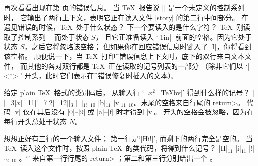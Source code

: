 {%
\ddangerexercise \1再次看看出现在第 \vshippage 页的错误信息。%
当 \TeX\ 报告说 |\vship| 是一个未定义的控制系列时，
它输出了两行上下文，表明它正在读入文件 |story| 的第二行中间部分。%
在遇见错误的时候，\TeX\ 处于什么状态？
下一个要读入的是什么字符？
\answer \TeX\ 刚读取了控制系列 |\vship| 而处于状态 $S$，
且它正准备读入 `|1in|' 前面的空格。因为它处于状态 $S$，之后它将忽略该空格；
但如果你在回应错误信息时键入了 |I\obeyspaces|，你将看到该空格。
顺便说一下，当 \TeX\ 打印^{错误信息上下文}时，底下的双行来自文本文件，
而其他的各对双行都是 \TeX\ 正在读取的记号列表的一部分
（除非它们以 `|<*>|' 开头，此时它们表示在^{错误修复}时插入的文本）。

\ddangerexercise 给定 plain \TeX\ 格式的类别码后，
从输入行 `| $x^2$~  \TeX  ^^62^^6|' 得到什么样的记号？
\answer |$|$_{3}$ |x|$_{11}$ |^|$_7$ |2|$_{12}$ |$|$_{3}$ |~|$_{13}$ \]$_{10}$
 |b|$_{11}$ |v|$_{11}$ \]$_{10}$。末尾的空格来自行尾的 \<return>。
代码 |^^6| 仅在其后没有 |0|--|9| 或 |a|--|f| 时才得到 |v|。
开头的空格会被忽略，因为在每行开头总处于状态 $N$。

\ddangerexercise 想想正好有三行的一个输入文件；
第一行是`|Hi!|', 而剩下的两行完全是空的。%
当 \TeX\ 读入这个文件时，按照 plain \TeX\ 的类代码，将得到什么记号？
\answer |H|$_{11}$ |i|$_{11}$ |!|$_{12}$ \]$_{10}$ 
。`\]' 来自第一行行尾的 \<return> ；第二和第三行分别给出一个 。

}
